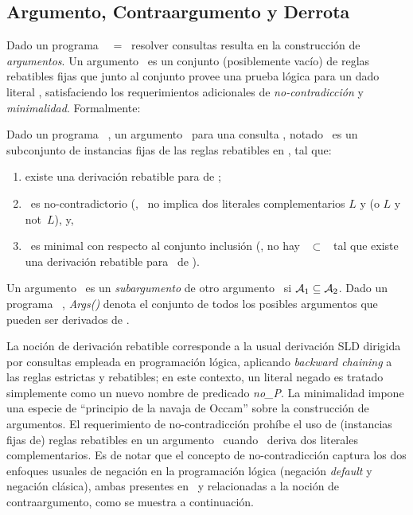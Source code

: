 \subsection{Argumento, Contraargumento y Derrota}

Dado un programa \DLP\ \PP\ = \SD\, resolver consultas resulta en la construcción de \textit{argumentos}.
Un argumento \ArgA\ es un conjunto (posiblemente vacío) de reglas rebatibles fijas que junto al conjunto \SSet
provee una prueba lógica para un dado literal \ArgQ, satisfaciendo los requerimientos adicionales de 
\textit{no-contradicción} y \textit{minimalidad}. Formalmente:

\begin{definicion}[Argumento]
	Dado un programa \DLP\ \PP, un argumento \ArgA\ para una consulta \ArgQ, notado \AQ\, es un subconjunto de 
	instancias fijas de las reglas rebatibles en \PP, tal que:
	
	\begin{enumerate}[(1)]
		\item existe una derivación rebatible para \ArgQ de \SyA;
		\item \SyA\ es no-contradictorio (\ie, \SyA\ no implica dos literales complementarios $L$ y 
		(o $L$ y \textsf{not}\ $L$), y,		
		\item \ArgA\ es minimal con respecto al conjunto inclusión (\ie, no hay \Ap\ $\subset$ \ArgA\ tal que
		existe una derivación rebatible para \ArgQ\ de \SyAp).
	\end{enumerate}
	
\end{definicion}

Un argumento \AaQa\ es un \textit{subargumento} de otro argumento \AbQb\ si $\mbox{${\mathcal A_1}$} \subseteq \mbox{${\mathcal A_2}$}$.
Dado un programa \DLP\ \PP, \textit{Args(\PP)} denota el conjunto de todos los posibles argumentos que 
pueden ser derivados de \PP.

La noción de derivación rebatible corresponde a la usual derivación SLD dirigida por consultas
empleada en programación lógica, aplicando \textit{backward chaining} a las reglas estrictas y rebatibles;
en este contexto, un literal negado  es tratado simplemente como un nuevo nombre de predicado \textit{no\_P}. La minimalidad impone una especie de ``principio de la navaja de Occam'' sobre la construcción 
de argumentos. El requerimiento de no-contradicción prohíbe el uso de (instancias fijas de) reglas rebatibles
en un argumento \ArgA\ cuando \SyA\ deriva dos literales complementarios. Es de notar que el concepto de no-contradicción captura los dos enfoques usuales de negación en la programación lógica (negación \textit{default}
y negación clásica), ambas presentes en \DLP\ y relacionadas a la noción de contraargumento, como se muestra a continuación.

